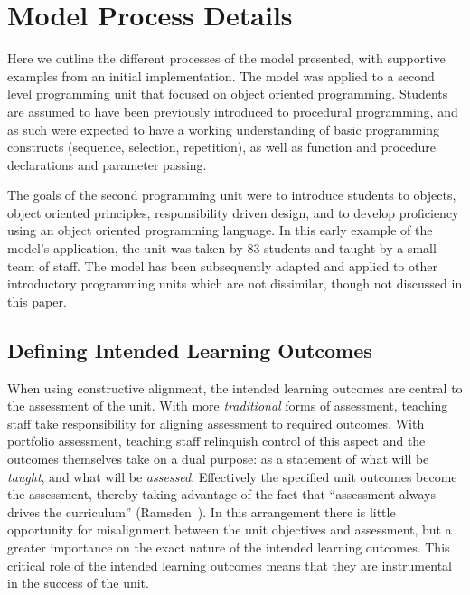 \section{Model Process Details} %
\label{sec:process_details}

Here we outline the different processes of the model presented, with supportive examples from an initial implementation. The model was applied to a second level programming unit that focused on object oriented programming. Students are assumed to have been previously introduced to procedural programming, and as such were expected to have a working understanding of basic programming constructs (sequence, selection, repetition), as well as function and procedure declarations and parameter passing. 

The goals of the second programming unit were to introduce students to objects, object oriented principles, responsibility driven design, and to develop proficiency using an object oriented programming language. In this early example of the model's application, the unit was taken by 83 students and taught by a small team of staff. The model has been subsequently adapted and applied to other introductory programming units which are not dissimilar, though not discussed in this paper.

\subsection{Defining Intended Learning Outcomes} %
\label{sub:defining_intended_learning_outcomes}

When using constructive alignment, the intended learning outcomes are central to the assessment of the unit. With more \emph{traditional} forms of assessment, teaching staff take responsibility for aligning assessment to required outcomes. With portfolio assessment, teaching staff relinquish control of this aspect and the outcomes themselves take on a dual purpose: as a statement of what will be \emph{taught}, and what will be \emph{assessed}. Effectively the specified unit outcomes become the assessment, thereby taking advantage of the fact that ``assessment always drives the curriculum'' (Ramsden~\cite{Ramsden:1992}).  In this arrangement there is little opportunity for misalignment between the unit objectives and assessment, but a greater importance on the exact nature of the intended learning outcomes. This critical role of the intended learning outcomes means that they are instrumental in the success of the unit. 

